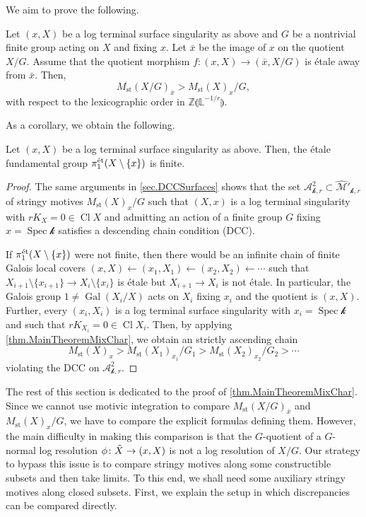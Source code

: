 \documentclass[12pt]{amsart}
\theoremstyle{plain}   %
\theoremstyle{definition}    %
\theoremstyle{remark}    %
\numberwithin{equation}{theorem}
\DeclareMathOperator{\Gal}{{Gal}}
\DeclareMathOperator{\Cl}{{Cl}}
\DeclareMathOperator{\st}{\mathrm{st}}
\DeclareMathOperator{\Spec}{{Spec}}
\newcommand{\kay}{\mathcal{k}}
\newcommand{\sA}{\mathcal{A}}
\newcommand{\sM}{\mathcal{M}}
\newcommand{\bL}{\mathbb{L}}
\newcommand{\bZ}{\mathbb{Z}}
\begin{document}
We aim to prove the following.

\begin{theorem} \label{thm.MainTheoremMixChar}
Let $(x,X)$ be a log terminal surface singularity as above and $G$ be a nontrivial finite group acting on $X$ and fixing $x$. Let $\bar{x}$ be the image of $x$ on the quotient $X/G$. Assume that the quotient morphism $f\colon (x,X) \to (\bar{x},X/G)$ is \'etale away from $\bar{x}$. Then,
\[
M_{\st}(X/G)_{\bar{x}}>M_{\st}(X)_x/G,
\]
with respect to the lexicographic order in $\bZ\llparenthesis \bL^{-1/r}\rrparenthesis$.
\end{theorem}

As a corollary, we obtain the following.

\begin{corollary} \label{cor.FinitenessFUndGrouosMixChar}
Let $(x,X)$ be a log terminal surface singularity as above. Then, the \'etale fundamental group $\pi_1^{\mathrm{\Acute{e}t}}(X\setminus \{x\})$ is finite.
\end{corollary}
\begin{proof}
The same arguments in \autoref{sec.DCCSurfaces} shows that the set $\sA^2_{\kay,r} \subset \hat{\sM}'_{\kay,r}$ of stringy motives $M_{\st}(X)_x/G$ such that $(X,x)$ is a log terminal singularity with $rK_X = 0 \in \Cl X$ and admitting an action of a finite group $G$ fixing $x=\Spec{\kay}$ satisfies a descending chain condition (DCC).

If $\pi_1^{\mathrm{\Acute{e}t}}(X\setminus \{x\})$ were not finite, then there would be an infinite chain of finite Galois local covers $(x,X) \leftarrow (x_1,X_1) \leftarrow (x_2,X_2) \leftarrow \cdots $ such that $X_{i+1}\setminus \{x_{i+1}\} \to X_i \setminus \{x_i\}$ is \'etale but $X_{i+1} \to X_i$ is not \'etale. In particular, the Galois group $1\neq \Gal(X_i/X)$ acts on $X_i$ fixing $x_i$ and the quotient is $(x,X)$. Further, every $(x_i,X_i)$ is a log terminal surface singularity with $x_i = \Spec \kay$ and such that $rK_{X_i} = 0\in \Cl X_i$. Then, by applying \autoref{thm.MainTheoremMixChar}, we obtain an strictly ascending chain
\[
M_{\st}(X)_x > M_{\st}(X_1)_{x_1}/G_1>M_{\st}(X_2)_{x_2}/G_2 > \cdots
\]
violating the DCC on $\sA^2_{\kay,r}$.
\end{proof}


The rest of this section is dedicated to the proof of \autoref{thm.MainTheoremMixChar}. Since we cannot use motivic integration to compare $M_{\st}(X/G)_{\bar{x}}$ and $M_{\st}(X)_x/G$, we have to compare the explicit formulas defining them. However, the main difficulty in making this comparison is that the $G$-quotient of a $G$-normal log resolution $\phi \colon \Tilde{X} \to (x,X)$ is not a log resolution of $X/G$. Our strategy to bypass this issue is to compare stringy motives along some constructible subsets and then take limits. To this end, we shall need some auxiliary stringy motives along closed subsets. First, we explain the setup in which discrepancies can be compared directly.
\end{document}
